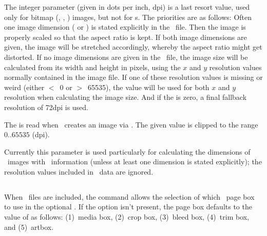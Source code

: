 \documentclass{pdftexmanual}
\begin{document}
The integer  parameter (given in dots per inch,
dpi) is a last resort value, used only for bitmap (\JPEG, \PNG,
\JBIGTWO) images, but not for \PDF{}s. The priorities are as follows:
Often one image dimension ( or ) is stated
explicitly in the \TEX\ file. Then the image is properly scaled so that
the aspect ratio is kept. If both image dimensions are given, the image
will be stretched accordingly, whereby the aspect ratio might get
distorted. If no image dimensions are given in the \TEX\ file, the image
size will be calculated from its width and height in pixels, using the
$x$ and $y$ resolution values normally contained in the image file. If
one of these resolution values is missing or weird (either $<$~0 or
$>$~65535), the  value will be used for both $x$
and $y$ resolution when calculating the image size. And if the
 is zero, a final fallback resolution of 72dpi is
used.

The  is read when \PDFTEX\ creates an image via
. The given value is clipped to the range $0..65535$
(dpi).

Currently this parameter is used particularly for calculating the
dimensions of \JPEG\ images with \EXIF\ information (unless at least one
dimension is stated explicitly); the resolution values included in
\EXIF\ data are ignored.

\subsection{}

When \PDF\ files are included, the command  allows the
selection of which \PDF\ page box to use in the optional
. If the option isn't present, the page box
defaults to the value of  as follows: (1)~media box,
(2)~crop box, (3)~bleed box, (4)~trim box, and (5)~artbox.

\subsection{}

\end{document}
